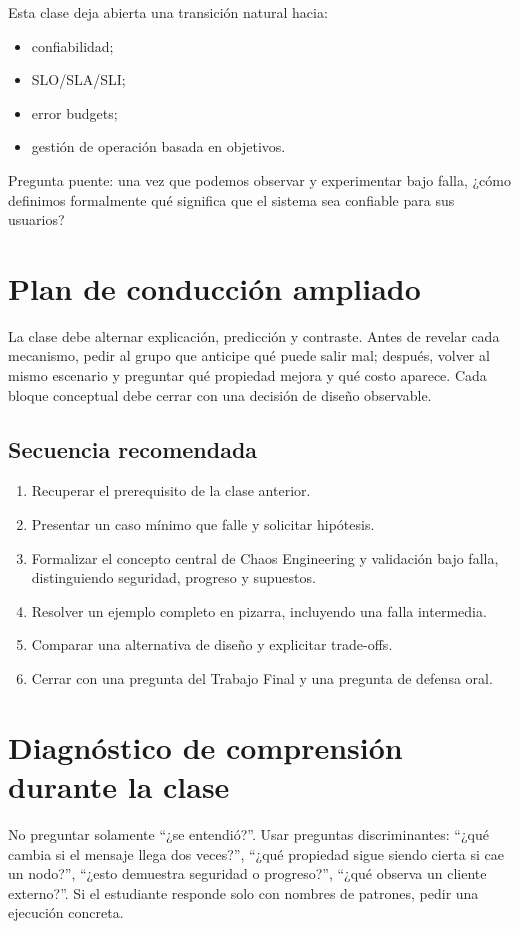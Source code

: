 \documentclass[variant=docente,cover=institutional,mode=screen]{ua-engineering-v6-article}
\begin{document}
Esta clase deja abierta una transición natural hacia:
\begin{itemize}
\item confiabilidad;
\item SLO/SLA/SLI;
\item error budgets;
\item gestión de operación basada en objetivos.
\end{itemize}

\begin{uakeybox}
Pregunta puente: una vez que podemos observar y experimentar bajo falla, ¿cómo definimos formalmente qué significa que el sistema sea confiable para sus usuarios?
\end{uakeybox}


\section{Plan de conducción ampliado}
La clase debe alternar explicación, predicción y contraste. Antes de revelar cada mecanismo, pedir al grupo que anticipe qué puede salir mal; después, volver al mismo escenario y preguntar qué propiedad mejora y qué costo aparece. Cada bloque conceptual debe cerrar con una decisión de diseño observable.
\subsection*{Secuencia recomendada}
\begin{enumerate}
\item Recuperar el prerequisito de la clase anterior.
\item Presentar un caso mínimo que falle y solicitar hipótesis.
\item Formalizar el concepto central de Chaos Engineering y validación bajo falla, distinguiendo seguridad, progreso y supuestos.
\item Resolver un ejemplo completo en pizarra, incluyendo una falla intermedia.
\item Comparar una alternativa de diseño y explicitar trade-offs.
\item Cerrar con una pregunta del Trabajo Final y una pregunta de defensa oral.
\end{enumerate}
\section{Diagnóstico de comprensión durante la clase}
No preguntar solamente ``¿se entendió?''. Usar preguntas discriminantes: ``¿qué cambia si el mensaje llega dos veces?'', ``¿qué propiedad sigue siendo cierta si cae un nodo?'', ``¿esto demuestra seguridad o progreso?'', ``¿qué observa un cliente externo?''. Si el estudiante responde solo con nombres de patrones, pedir una ejecución concreta.
\end{document}
